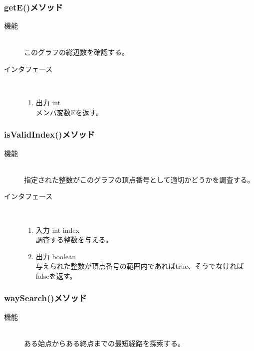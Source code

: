 \documentclass[a4j]{jarticle}
\begin{document}
\begin{description}
\begin{description}
\subsubsection{getE()メソッド}

\begin{description}
\item[機能]\mbox{}\\
このグラフの総辺数を確認する。
\item[インタフェース]\
  \begin{enumerate}
  \item 出力 int\mbox{}\\
    メンバ変数Eを返す。
  \end{enumerate}
\end{description}

\subsubsection{isValidIndex()メソッド}

\begin{description}
\item[機能]\mbox{}\\
指定された整数がこのグラフの頂点番号として適切かどうかを調査する。

\item[インタフェース]\
  \begin{enumerate}
  \item 入力 int index\mbox{}\\
    調査する整数を与える。
  \item 出力 boolean\mbox{}\\
    与えられた整数が頂点番号の範囲内であればtrue、そうでなければfalseを返す。
  \end{enumerate}
\end{description}

\subsubsection{waySearch()メソッド}

\begin{description}
\item[機能]\mbox{}\\
ある始点からある終点までの最短経路を探索する。


\end{description}
\end{description}
\end{description}
\end{document}
